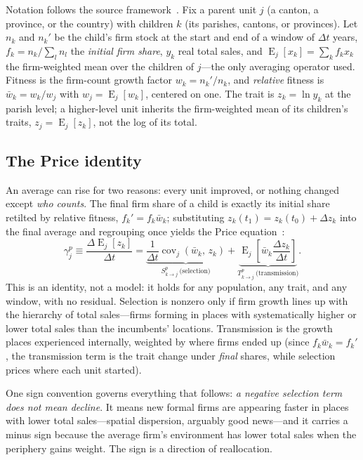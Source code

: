 \documentclass[conference]{IEEEtran}
\newcommand{\Cov}{\operatorname{cov}}
\newcommand{\E}{\operatorname{E}}
\begin{document}
Notation follows the source framework~\cite{kemp2025}. Fix a parent unit
$j$ (a canton, a province, or the country) with children $k$ (its parishes,
cantons, or provinces). Let $n_k$ and $n_k'$ be the child's firm stock at
the start and end of a window of $\Delta t$ years, $f_k = n_k / \sum_l n_l$
the \textit{initial firm share}, $y_k$ real total sales, and
$\E_j[x_k] = \sum_k f_k x_k$ the firm-weighted mean over the children of
$j$---the only averaging operator used. Fitness is the firm-count growth
factor $w_k = n_k'/n_k$, and \textit{relative} fitness is
$\bar w_k = w_k / w_j$ with $w_j = \E_j[w_k]$, centered on one. The trait
is $z_k = \ln y_k$ at the parish level; a higher-level unit inherits the
firm-weighted mean of its children's traits, $z_j = \E_j[z_k]$, not the log
of its total.

\subsection{The Price identity}

An average can rise for two reasons: every unit improved, or nothing
changed except \textit{who counts}. The final firm share of a child is
exactly its initial share retilted by relative fitness,
$f_k' = f_k \bar w_k$; substituting $z_k(t_1) = z_k(t_0) + \Delta z_k$
into the final average and regrouping once yields the Price
equation~\cite{price1970}:
\begin{equation}
\gamma^{p}_j \equiv \frac{\Delta \E_j[z_k]}{\Delta t}
= \underbrace{\frac{1}{\Delta t}\Cov_j\!\left(\bar w_k,\, z_k\right)}_{S^{p}_{k\to j}\ \text{(selection)}}
+ \underbrace{\E_j\!\left[\bar w_k \frac{\Delta z_k}{\Delta t}\right]}_{T^{p}_{k\to j}\ \text{(transmission)}} .
\label{eq:price}
\end{equation}
This is an identity, not a model: it holds for any population, any trait,
and any window, with no residual. Selection is nonzero only if firm growth
lines up with the hierarchy of total sales---firms forming in places with
systematically higher or lower total sales than the incumbents'
locations. Transmission is the growth places experienced internally,
weighted by where firms ended up (since $f_k \bar w_k = f_k'$, the
transmission term is the trait change under \textit{final} shares, while
selection prices where each unit started).

One sign convention governs everything that follows: \textit{a negative
selection term does not mean decline}. It means new formal firms are
appearing faster in places with lower total sales---spatial dispersion,
arguably good news---and it carries a minus sign because the average
firm's environment has lower total sales when the periphery gains weight.
The sign is a direction of reallocation.
\end{document}
